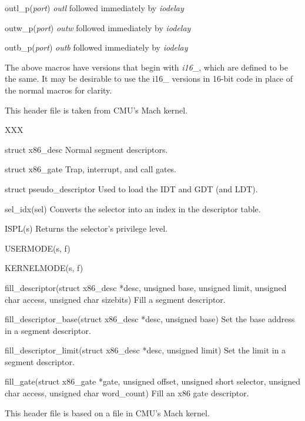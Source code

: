 \begin{apidesc}
\begin{csymlist}
	\item[outl_p(\emph{port})]	\label{outl-p}
		\emph{outl} followed immediately by \emph{iodelay}
	\item[outw_p(\emph{port})]	\label{outw-p}
		\emph{outw} followed immediately by \emph{iodelay}
	\item[outb_p(\emph{port})]	\label{outb-p}
		\emph{outb} followed immediately by \emph{iodelay}
	\end{csymlist}

	The above macros have versions that begin with \emph{i16_},
	which are defined to be the same.
	It may be desirable to use the i16_ versions in 16-bit code
	in place of the normal macros for clarity.

	This header file is taken from CMU's Mach kernel.
\end{apidesc}

\label{seg-h}
\begin{apisyn}
\end{apisyn}
\begin{apidesc}
	XXX

	\begin{csymlist}
	\item[struct x86_desc]
		Normal segment descriptors.
	\item[struct x86_gate]
		Trap, interrupt, and call gates.
	\item[struct pseudo_descriptor]
		Used to load the IDT and GDT (and LDT).
	\item[sel_idx(sel)]
		Converts the selector into an index in the descriptor table.
	\item[ISPL(s)]
		Returns the selector's privilege level.
	\item[USERMODE(s, f)]
	\item[KERNELMODE(s, f)]
	\item[fill_descriptor(struct x86_desc *desc, unsigned base,
		unsigned limit, unsigned char access, unsigned char sizebits)]
		Fill a segment descriptor.
	\item[fill_descriptor_base(struct x86_desc *desc, unsigned base)]
		Set the base address in a segment descriptor.
	\item[fill_descriptor_limit(struct x86_desc *desc, unsigned limit)]
		Set the limit in a segment descriptor.
	\item[fill_gate(struct x86_gate *gate, unsigned offset,
		unsigned short selector, unsigned char access,
		unsigned char word_count)]
		Fill an x86 gate descriptor.
	\end{csymlist}

	This header file is based on a file in CMU's Mach kernel.
\end{apidesc}

